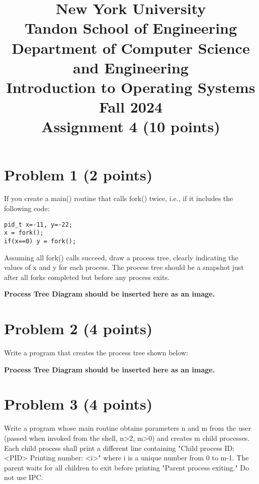 \documentclass{article}
\begin{document}
\title{New York University \\ Tandon School of Engineering \\ Department of Computer Science and Engineering \\ Introduction to Operating Systems \\ Fall 2024 \\ Assignment 4 (10 points)}
\date{}
\maketitle

\section*{Problem 1 (2 points)}

If you create a main() routine that calls fork() twice, i.e., if it includes the following code:

\begin{verbatim}
pid_t x=-11, y=-22;
x = fork();
if(x==0) y = fork();
\end{verbatim}

Assuming all fork() calls succeed, draw a process tree, clearly indicating the values of x and y for each process. The process tree should be a snapshot just after all forks completed but before any process exits.

\textbf{Process Tree Diagram should be inserted here as an image.}


\section*{Problem 2 (4 points)}

Write a program that creates the process tree shown below:

\textbf{Process Tree Diagram should be inserted here as an image.}


\section*{Problem 3 (4 points)}

Write a program whose main routine obtains parameters n and m from the user (passed when invoked from the shell, n>2, m>0) and creates m child processes.  Each child process shall print a different line containing "Child process ID: <PID>  Printing number: <i>" where i is a unique number from 0 to m-1. The parent waits for all children to exit before printing "Parent process exiting." Do not use IPC.
\end{document}
